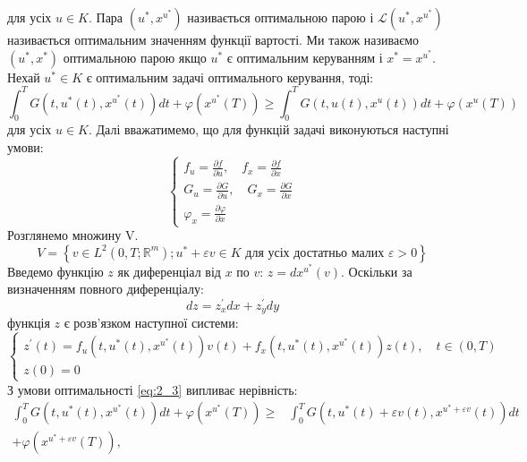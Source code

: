 \documentclass[a4paper,12pt]{extreport}
\begin{document}
    для усіх $u \in K$. Пара $\left(u^*, x^{u^*}\right)$ називається оптимальною парою і $\mathcal{L}\left(u^*, x^{u^*}\right)$ називається оптимальним значенням функції вартості. Ми також називаємо $\left(u^*, x^*\right)$ оптимальною парою якщо $u^*$ є оптимальним керуванням і $x^*=x^{u^*}$.
    Нехай $u^* \in K$ є оптимальним задачі оптимального керування, тоді:
    \begin{equation} \label{eq:2_3}
        \int_0^T G\left(t, u^*(t), x^{u^*}(t)\right) d t+\varphi\left(x^{u^*}(T)\right) \geq \int_0^T G\left(t, u(t), x^u(t)\right) d t+\varphi\left(x^u(T)\right)
    \end{equation}
    для усіх $u \in K$.
    Далі вважатимемо, що для функцій задачі виконуються наступні умови:
    $$
        \left\{\begin{array}{l}
            f_u=\frac{\partial f}{\partial u}, \quad f_x=\frac{\partial f}{\partial x} \\
            G_u=\frac{\partial G}{\partial u}, \quad G_x=\frac{\partial G}{\partial x} \\
            \varphi_x=\frac{\partial \varphi}{\partial x}
        \end{array}\right.
    $$
    Розглянемо множину V.
    $$
        V=\left\{v \in L^2\left(0, T ; \mathbb{R}^m\right) ; u^*+\varepsilon v \in K \text { для усіх достатньо малих } \varepsilon>0 \right\}
    $$
    Введемо функцію $z$ як диференціал від $x$ по $v$: $z=d x^{u^*}(v)$. 
    Оскільки за визначенням повного диференціалу:
    $$ d z=z_x^{\prime} d x+z_y^{\prime} d y $$
    функція $z$ є розв'язком наступної системи:
    \begin{equation} \label{eq:2_4}
        \left\{\begin{array}{l}
            z^{\prime}(t)=f_u\left(t, u^*(t), x^{u^*}(t)\right) v(t)+f_x\left(t, u^*(t), x^{u^*}(t)\right) z(t), \quad t \in(0, T) \\
            z(0)=0
        \end{array}\right.
    \end{equation}
    З умови оптимальності \ref{eq:2_3} випливає нерівність:
    \begin{equation} \label{eq:2_5}
        \begin{aligned}
            \int_0^T G\left(t, u^*(t), x^{u^*}(t)\right) d t+\varphi\left(x^{u^*}(T)\right) \geq & \int_0^T G\left(t, u^*(t)+\varepsilon v(t), x^{u^*+\varepsilon v}(t)\right) d t \\
            +\varphi\left(x^{u^*+\varepsilon v}(T)\right),
        \end{aligned}
    \end{equation}
\end{document}
